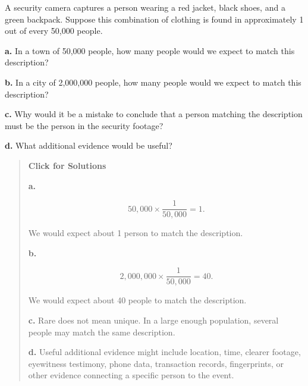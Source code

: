 \documentclass[
  letterpaper,
  DIV=11,
  numbers=noendperiod]{scrreprt}
\begin{document}
\begin{tcolorbox}[enhanced jigsaw, arc=.35mm, bottomrule=.15mm, bottomtitle=1mm, breakable, colback=white, colbacktitle=quarto-callout-note-color!10!white, colframe=quarto-callout-note-color-frame, coltitle=black, left=2mm, leftrule=.75mm, opacityback=0, opacitybacktitle=0.6, rightrule=.15mm, title=\textcolor{quarto-callout-note-color}{\faInfo}\hspace{0.5em}{Question 6}, titlerule=0mm, toprule=.15mm, toptitle=1mm]

A security camera captures a person wearing a red jacket, black shoes,
and a green backpack. Suppose this combination of clothing is found in
approximately 1 out of every 50,000 people.

\textbf{a.} In a town of 50,000 people, how many people would we expect
to match this description?

\textbf{b.} In a city of 2,000,000 people, how many people would we
expect to match this description?

\textbf{c.} Why would it be a mistake to conclude that a person matching
the description must be the person in the security footage?

\textbf{d.} What additional evidence would be useful?

\begin{quote}
\textbf{Click for Solutions}

\textbf{a.}

\[50{,}000 \times \frac{1}{50{,}000} = 1.\]

We would expect about 1 person to match the description.

\textbf{b.}

\[2{,}000{,}000 \times \frac{1}{50{,}000} = 40.\]

We would expect about 40 people to match the description.

\textbf{c.} Rare does not mean unique. In a large enough population,
several people may match the same description.

\textbf{d.} Useful additional evidence might include location, time,
clearer footage, eyewitness testimony, phone data, transaction records,
fingerprints, or other evidence connecting a specific person to the
event.
\end{quote}

\end{tcolorbox}
\end{document}

